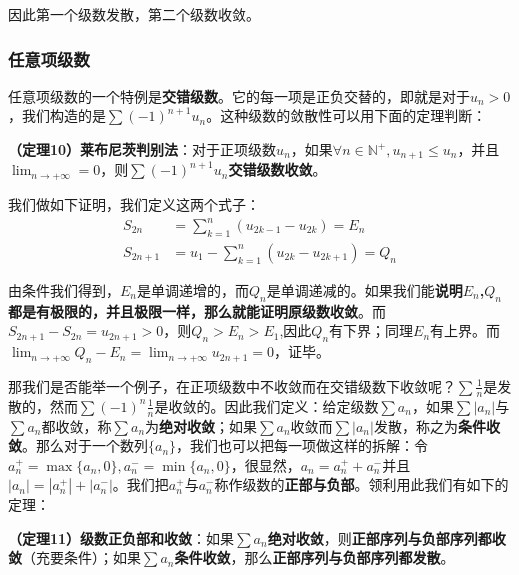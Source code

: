 \documentclass{ctexart}
\let\oldtextbf\textbf
\renewcommand{\textbf}[1]{\textcolor{brown!50!red}{\oldtextbf{#1}}}
\begin{document}
因此第一个级数发散，第二个级数收敛。

\subsubsection{任意项级数}
任意项级数的一个特例是\textbf{\color{brown!50!red}交错级数}。它的每一项是正负交替的，即就是对于$u_n>0$，我们构造的是$\sum(-1)^{n+1} u_n$。这种级数的敛散性可以用下面的定理判断：
\begin{tcolorbox}[
    colback=bac2,     %
    colframe=fra2,   %
    coltitle=white,             %
    coltext=tex2,
    title=莱布尼茨判别法,
    fonttitle=\bfseries,        %
arc=3mm,                     %
breakable
]
\textbf{\color{brown!50!red}（定理10）莱布尼茨判别法}：对于正项级数$u_n$，如果$\forall n\in \mathbb{N}^+,u_{n+1}\leq u_n$，并且$\lim_{n\to+\infty}=0$，则$\sum (-1)^{n+1}u_n$\textbf{\color{brown!50!red}交错级数收敛}。
\end{tcolorbox}



我们做如下证明，我们定义这两个式子：
\begin{align*}
    S_{2n}&=\sum_{k=1}^n(u_{2k-1}-u_{2k})=E_n\\
    S_{2n+1}&=u_1-\sum_{k=1}^n(u_{2k}-u_{2k+1})=Q_n
\end{align*}

由条件我们得到，$E_n$是单调递增的，而$Q_n$是单调递减的。如果我们能\textbf{\color{brown!50!red}说明$E_n$,$Q_n$都是有极限的，并且极限一样，那么就能证明原级数收敛}。而$S_{2n+1}-S_{2n}=u_{2n+1}>0$，则$Q_n>E_n>E_1$,因此$Q_n$有下界；同理$E_n$有上界。而$\lim_{n\to+\infty}Q_n-E_n=\lim_{n\to+\infty}u_{2n+1}=0$，证毕。

那我们是否能举一个例子，在正项级数中不收敛而在交错级数下收敛呢？$\sum\frac{1}{n}$是发散的，然而$\sum(-1)^n\frac{1}{n}$是收敛的。因此我们定义：给定级数$\sum a_n$，如果$\sum |a_n|$与$\sum a_n$都收敛，称$\sum a_n$为\textbf{\color{brown!50!red}绝对收敛}；如果$\sum a_n$收敛而$\sum |a_n|$发散，称之为\textbf{\color{brown!50!red}条件收敛}。那么对于一个数列$\{a_n\}$，我们也可以把每一项做这样的拆解：令$a_n^+=\max\{a_n,0\},a_n^-=\min\{a_n,0\}$，很显然，$a_n=a_n^++a_n^-$并且$|a_n|=|a_n^+|+|a_n^-|$。我们把$a_n^+$与$a_n^-$称作级数的\textbf{\color{brown!50!red}正部与负部}。领利用此我们有如下的定理：
\begin{tcolorbox}[
    colback=bac2,     %
    colframe=fra2,   %
    coltitle=white,             %
    coltext=tex2,
    title=级数正部和负部与任意项级数收敛的关系,
    fonttitle=\bfseries,        %
arc=3mm,                     %
breakable
]
\textbf{\color{brown!50!red}（定理11）级数正负部和收敛}：如果$\sum a_n$\textbf{\color{brown!50!red}绝对收敛}，则\textbf{\color{brown!50!red}正部序列与负部序列都收敛}（充要条件）；如果$\sum a_n$\textbf{\color{brown!50!red}条件收敛}，那么\textbf{\color{brown!50!red}正部序列与负部序列都发散}。
\end{tcolorbox}
\end{document}
